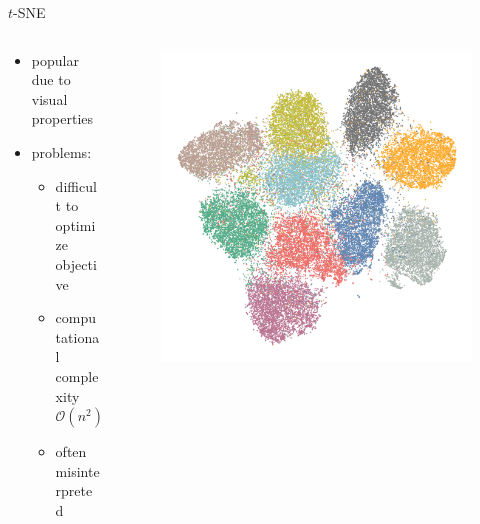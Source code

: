 \documentclass{beamer}
\begin{document}
\begin{frame}[fragile]{$t$-SNE}
    \begin{columns}
    \begin{column}{0.6\textwidth}
        \begin{itemize}
            \item popular due to visual properties
            \item problems:
                \begin{itemize}
                    \item difficult to optimize objective
                    \item computational complexity $\mathcal{O}(n^2)$
                    \item often misinterpreted
                \end{itemize}
        \end{itemize}
    \end{column}
    \begin{column}{0.38\textwidth}
        \begin{figure}[h]
            \centering
            \includegraphics[width=\textwidth]{tsne_emb_cifar}
        \end{figure}
    \end{column}
\end{columns}
\end{frame}
\end{document}
